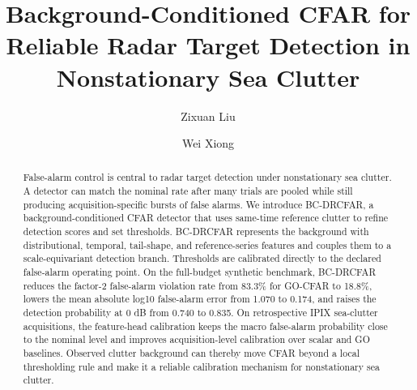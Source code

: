\documentclass[preprint,12pt]{elsarticle}
\begin{document}
\begin{frontmatter}

\title{Background-Conditioned CFAR for Reliable Radar Target Detection in Nonstationary Sea Clutter}

\author[aff1]{Zixuan Liu}
\author[aff2,aff3]{Wei Xiong}



\begin{abstract}
False-alarm control is central to radar target detection under nonstationary sea
clutter. A detector can match the nominal rate after many trials are pooled
while still producing acquisition-specific bursts of false alarms. We introduce
BC-DRCFAR, a background-conditioned CFAR detector that uses
same-time reference clutter to refine detection scores and set thresholds.
BC-DRCFAR represents the background with distributional, temporal, tail-shape,
and reference-series features and couples them to a scale-equivariant detection
branch. Thresholds are calibrated directly to the declared false-alarm operating
point.
On the full-budget synthetic benchmark, BC-DRCFAR reduces the factor-2
false-alarm violation rate from 83.3\% for GO-CFAR to 18.8\%, lowers the mean
absolute log10 false-alarm error from 1.070 to 0.174, and raises the detection
probability at 0 dB from 0.740 to 0.835. On retrospective IPIX sea-clutter
acquisitions, the feature-head calibration keeps the macro false-alarm
probability close to the nominal level and improves acquisition-level
calibration over scalar and GO baselines. Observed clutter background can
thereby move CFAR beyond a local thresholding rule and make it a reliable
calibration mechanism for nonstationary sea clutter.
\end{abstract}


\end{frontmatter}
\end{document}
